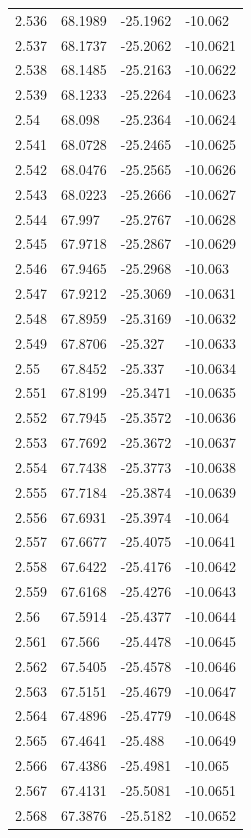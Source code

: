 \begin{tabular}{llll}
2.536 & 68.1989 & -25.1962 & -10.062 \\
2.537 & 68.1737 & -25.2062 & -10.0621 \\
2.538 & 68.1485 & -25.2163 & -10.0622 \\
2.539 & 68.1233 & -25.2264 & -10.0623 \\
2.54 & 68.098 & -25.2364 & -10.0624 \\
2.541 & 68.0728 & -25.2465 & -10.0625 \\
2.542 & 68.0476 & -25.2565 & -10.0626 \\
2.543 & 68.0223 & -25.2666 & -10.0627 \\
2.544 & 67.997 & -25.2767 & -10.0628 \\
2.545 & 67.9718 & -25.2867 & -10.0629 \\
2.546 & 67.9465 & -25.2968 & -10.063 \\
2.547 & 67.9212 & -25.3069 & -10.0631 \\
2.548 & 67.8959 & -25.3169 & -10.0632 \\
2.549 & 67.8706 & -25.327 & -10.0633 \\
2.55 & 67.8452 & -25.337 & -10.0634 \\
2.551 & 67.8199 & -25.3471 & -10.0635 \\
2.552 & 67.7945 & -25.3572 & -10.0636 \\
2.553 & 67.7692 & -25.3672 & -10.0637 \\
2.554 & 67.7438 & -25.3773 & -10.0638 \\
2.555 & 67.7184 & -25.3874 & -10.0639 \\
2.556 & 67.6931 & -25.3974 & -10.064 \\
2.557 & 67.6677 & -25.4075 & -10.0641 \\
2.558 & 67.6422 & -25.4176 & -10.0642 \\
2.559 & 67.6168 & -25.4276 & -10.0643 \\
2.56 & 67.5914 & -25.4377 & -10.0644 \\
2.561 & 67.566 & -25.4478 & -10.0645 \\
2.562 & 67.5405 & -25.4578 & -10.0646 \\
2.563 & 67.5151 & -25.4679 & -10.0647 \\
2.564 & 67.4896 & -25.4779 & -10.0648 \\
2.565 & 67.4641 & -25.488 & -10.0649 \\
2.566 & 67.4386 & -25.4981 & -10.065 \\
2.567 & 67.4131 & -25.5081 & -10.0651 \\
2.568 & 67.3876 & -25.5182 & -10.0652 \\

\end{tabular}
